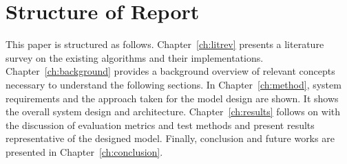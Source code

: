\section{Structure of Report}
This paper is structured as follows. Chapter~\ref{ch:litrev} presents a
literature survey on the existing algorithms and their implementations.
Chapter~\ref{ch:background} provides a background overview of relevant concepts
necessary to understand the following sections. In Chapter~\ref{ch:method},
system requirements and the approach taken for the model design are shown. It
shows the overall system design and architecture. Chapter~\ref{ch:results}
follows on with the discussion of evaluation metrics and test methods and
present results representative of the designed model. Finally, conclusion and
future works are presented in Chapter~\ref{ch:conclusion}. 

